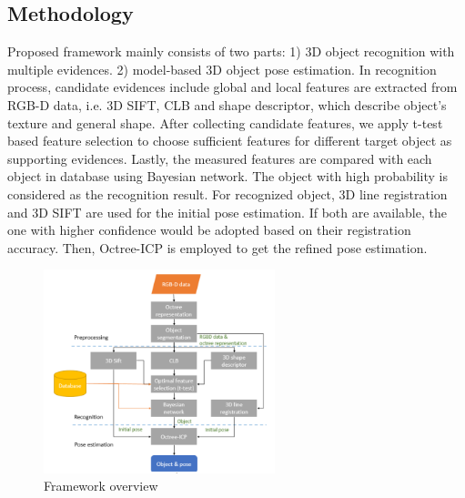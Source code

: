 \documentclass{ieeeaccess}
\begin{document}
\subsection{Methodology}
Proposed framework mainly consists of two parts: 1) 3D
object recognition with multiple evidences. 2) model-based
3D object pose estimation. In recognition process, candidate
evidences include global and local features are extracted from
RGB-D data, i.e. 3D SIFT, CLB and shape descriptor, which
describe object’s texture and general shape. After
collecting candidate features, we apply t-test based feature
selection to choose sufficient features for different target
object as supporting evidences. Lastly, the measured features
are compared with each object in database using Bayesian
network. The object with high probability is considered as the
recognition result. For recognized object, 3D line registration
and 3D SIFT are used for the initial pose estimation. If both
are available, the one with higher confidence would be
adopted based on their registration accuracy. Then,
Octree-ICP is employed to get the refined pose estimation.

\begin{figure}[t!]
\centering
\includegraphics[width=0.6\textwidth]{bayesian_framework.png}
\caption{Framework overview}
\end{figure}

\end{document}
